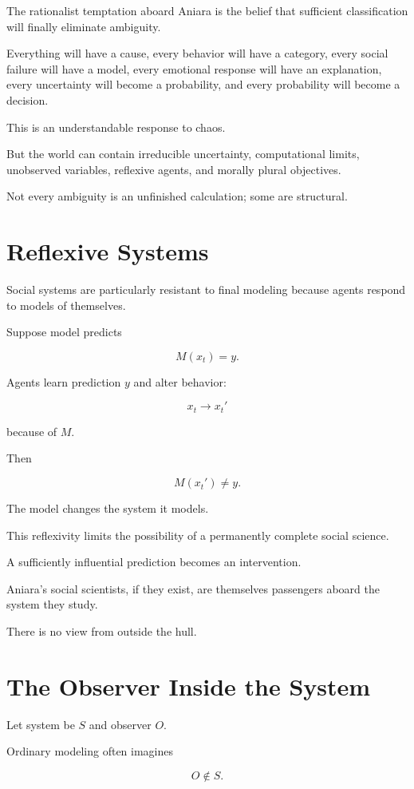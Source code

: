 \documentclass[11pt,oneside]{book}
\theoremstyle{definition}
\theoremstyle{remark}
\begin{document}
The rationalist temptation aboard Aniara is the belief that sufficient classification will finally eliminate ambiguity.

Everything will have a cause, every behavior will have a category, every social failure will have a model, every emotional response will have an explanation, every uncertainty will become a probability, and every probability will become a decision.

This is an understandable response to chaos.

But the world can contain irreducible uncertainty, computational limits, unobserved variables, reflexive agents, and morally plural objectives.

Not every ambiguity is an unfinished calculation; some are structural.

\section{Reflexive Systems}

Social systems are particularly resistant to final modeling because agents respond to models of themselves.

Suppose model predicts

\[
M(x_t)=y.
\]

Agents learn prediction \(y\) and alter behavior:

\[
x_t\rightarrow x_t'
\]

because of \(M\).

Then

\[
M(x_t')
\neq y.
\]

The model changes the system it models.

This reflexivity limits the possibility of a permanently complete social science.

A sufficiently influential prediction becomes an intervention.

Aniara's social scientists, if they exist, are themselves passengers aboard the system they study.

There is no view from outside the hull.

\section{The Observer Inside the System}

Let system be \(S\) and observer \(O\).

Ordinary modeling often imagines

\[
O\notin S.
\]
\end{document}
